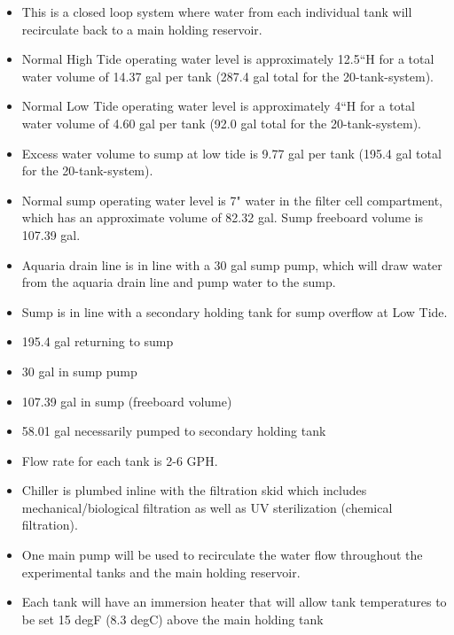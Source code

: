 \documentclass[]{book}
\providecommand{\tightlist}{%
  \setlength{\itemsep}{0pt}\setlength{\parskip}{0pt}}
\begin{document}
\begin{itemize}
\tightlist
\item
  This is a closed loop system where water from each individual tank
  will recirculate back to a main holding reservoir.\\
\item
  Normal High Tide operating water level is approximately 12.5``H for a
  total water volume of 14.37 gal per tank (287.4 gal total for the
  20-tank-system).\\
\item
  Normal Low Tide operating water level is approximately 4``H for a
  total water volume of 4.60 gal per tank (92.0 gal total for the
  20-tank-system).\\
\item
  Excess water volume to sump at low tide is 9.77 gal per tank (195.4
  gal total for the 20-tank-system).\\
\item
  Normal sump operating water level is 7" water in the filter cell
  compartment, which has an approximate volume of 82.32 gal. Sump
  freeboard volume is 107.39 gal.\\
\item
  Aquaria drain line is in line with a 30 gal sump pump, which will draw
  water from the aquaria drain line and pump water to the sump.
\item
  Sump is in line with a secondary holding tank for sump overflow at Low
  Tide.
\item
  195.4 gal returning to sump
\item
  30 gal in sump pump
\item
  107.39 gal in sump (freeboard volume)
\item
  58.01 gal necessarily pumped to secondary holding tank
\item
  Flow rate for each tank is 2-6 GPH.\\
\item
  Chiller is plumbed inline with the filtration skid which includes
  mechanical/biological filtration as well as UV sterilization (chemical
  filtration).\\
\item
  One main pump will be used to recirculate the water flow throughout
  the experimental tanks and the main holding reservoir.\\
\item
  Each tank will have an immersion heater that will allow tank
  temperatures to be set 15 degF (8.3 degC) above the main holding tank

\end{itemize}
\end{document}
